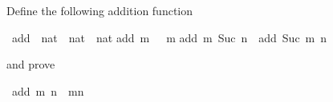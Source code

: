 %
\begin{isabellebody}%
\def\isabellecontext{Plus}%
%
\isadelimtheory
%
\endisadelimtheory
%
\isatagtheory
%
\endisatagtheory
{\isafoldtheory}%
%
\isadelimtheory
%
\endisadelimtheory
%
\begin{isamarkuptext}%
\noindent Define the following addition function%
\end{isamarkuptext}%
\isamarkuptrue%
\isamarkupfalse%
\ add\ {\isacharcolon}{\isacharcolon}\ {\isachardoublequoteopen}nat\ {\isasymRightarrow}\ nat\ {\isasymRightarrow}\ nat{\isachardoublequoteclose}\isanewline
{}\isamarkupfalse%
\isanewline
{\isachardoublequoteopen}add\ m\ {}\ {\isacharequal}\ m{\isachardoublequoteclose}\isanewline
{\isachardoublequoteopen}add\ m\ {\isacharparenleft}Suc\ n{\isacharparenright}\ {\isacharequal}\ add\ {\isacharparenleft}Suc\ m{\isacharparenright}\ n{\isachardoublequoteclose}%
\begin{isamarkuptext}%
\noindent and prove%
\end{isamarkuptext}%
\isamarkuptrue%
%
\isadelimproof
%
\endisadelimproof
%
\isatagproof
%
\endisatagproof
{\isafoldproof}%
%
\isadelimproof
%
\endisadelimproof
{}\isamarkupfalse%
\ {\isachardoublequoteopen}add\ m\ n\ {\isacharequal}\ m{\isacharplus}n{\isachardoublequoteclose}%
\isadelimproof
%
\endisadelimproof
%
\isatagproof
%
\endisatagproof
{\isafoldproof}%
%
\isadelimproof
%
\endisadelimproof
%
\isadelimtheory
%
\endisadelimtheory
%
\isatagtheory
%
\endisatagtheory
{\isafoldtheory}%
%
\isadelimtheory
%
\endisadelimtheory
\end{isabellebody}%
